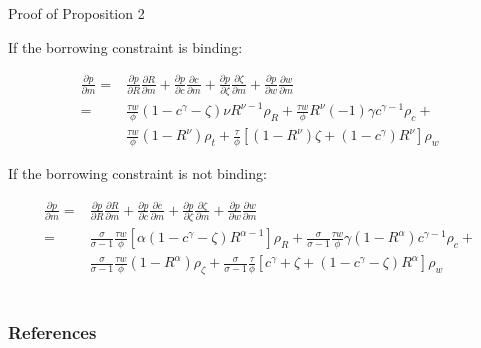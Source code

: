 \documentclass[10pt]{beamer}
\begin{document}
\begin{frame}[label=proof]{Proof of Proposition 2}

If the borrowing constraint is binding:

\begin{align*} 
\frac{\partial p}{\partial m} =&\frac{\partial p}{\partial R}\frac{\partial R}{\partial m}+\frac{\partial p}{\partial c}\frac{\partial c}{\partial m}+\frac{\partial p}{\partial \zeta}\frac{\partial \zeta}{\partial m}+\frac{\partial p}{\partial w}\frac{\partial w}{\partial m}  \\
=& \frac{\tau w}{\phi}(1-c^\gamma-\zeta)\nu R^{\nu-1} \rho_R+ \frac{\tau w}{\phi} R^\nu(-1)\gamma c^{\gamma-1} \rho_c +\\  
& \frac{\tau w}{\phi}(1-R^\nu) \rho_t+\frac{\tau}{\phi}[(1-R^\nu)\zeta+(1-c^\gamma)R^\nu] \rho_w
\end{align*} 

If the borrowing constraint is not binding:

\begin{align*} 
\frac{\partial p}{\partial m} =&\frac{\partial p}{\partial R}\frac{\partial R}{\partial m}+\frac{\partial p}{\partial c}\frac{\partial c}{\partial m}+\frac{\partial p}{\partial \zeta}\frac{\partial \zeta}{\partial m}+\frac{\partial p}{\partial w}\frac{\partial w}{\partial m}  \\
=& \frac{\sigma}{\sigma-1}\frac{\tau w}{\phi}[\alpha(1-c^\gamma-\zeta)R^{\alpha-1}] \rho_R + \frac{\sigma}{\sigma-1}\frac{\tau w}{\phi}\gamma(1-R^\alpha)c^{\gamma-1} \rho_c + \\
& \frac{\sigma}{\sigma-1}\frac{\tau w}{\phi} (1-R^\alpha) \rho_\zeta + \frac{\sigma}{\sigma-1}\frac{\tau}{\phi}[c^\gamma+\zeta+(1-c^\gamma-\zeta)R^\alpha] \rho_w
\end{align*} \\
\hyperlink{Proposition}{}
\end{frame}


\begin{frame}[allowframebreaks]
\frametitle{References}
    \footnotesize
    
\end{frame}
\end{document}
